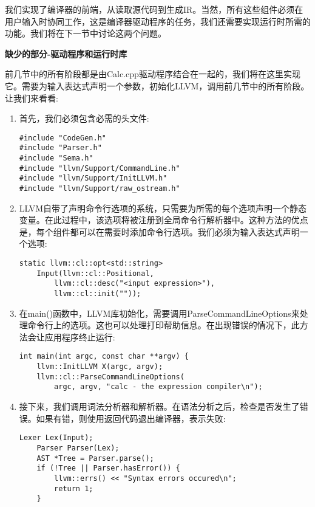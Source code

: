 我们实现了编译器的前端，从读取源代码到生成IR。当然，所有这些组件必须在用户输入时协同工作，这是编译器驱动程序的任务，我们还需要实现运行时所需的功能。我们将在下一节中讨论这两个问题。\par

\hspace*{\fill} \par %
\textbf{缺少的部分-驱动程序和运行时库}

前几节中的所有阶段都是由Calc.cpp驱动程序结合在一起的，我们将在这里实现它。需要为输入表达式声明一个参数，初始化LLVM，调用前几节中的所有阶段。让我们来看看:

\begin{enumerate}
\item 首先，我们必须包含必需的头文件:
\begin{lstlisting}[caption={}]
#include "CodeGen.h"
#include "Parser.h"
#include "Sema.h"
#include "llvm/Support/CommandLine.h"
#include "llvm/Support/InitLLVM.h"
#include "llvm/Support/raw_ostream.h"
\end{lstlisting}

\item LLVM自带了声明命令行选项的系统，只需要为所需的每个选项声明一个静态变量。在此过程中，该选项将被注册到全局命令行解析器中。这种方法的优点是，每个组件都可以在需要时添加命令行选项。我们必须为输入表达式声明一个选项:
\begin{lstlisting}[caption={}]
static llvm::cl::opt<std::string>
	Input(llvm::cl::Positional,
		llvm::cl::desc("<input expression>"),
		llvm::cl::init(""));
\end{lstlisting}

\item 在main()函数中，LLVM库初始化，需要调用ParseCommandLineOptions来处理命令行上的选项。这也可以处理打印帮助信息。在出现错误的情况下，此方法会让应用程序终止运行:
\begin{lstlisting}[caption={}]
int main(int argc, const char **argv) {
	llvm::InitLLVM X(argc, argv);
	llvm::cl::ParseCommandLineOptions(
		argc, argv, "calc - the expression compiler\n");
\end{lstlisting}

\item 接下来，我们调用词法分析器和解析器。在语法分析之后，检查是否发生了错误。如果有错，则使用返回代码退出编译器，表示失败:
\begin{lstlisting}[caption={}]
	Lexer Lex(Input);
	Parser Parser(Lex);
	AST *Tree = Parser.parse();
	if (!Tree || Parser.hasError()) {
		llvm::errs() << "Syntax errors occured\n";
		return 1;
	}
\end{lstlisting}


\end{enumerate}
